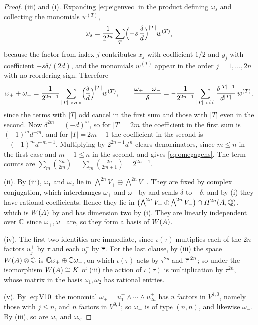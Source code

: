 \begin{proof}
(iii) and (i). Expanding \eqref{eq:eigenvec} in the product defining
$\omega_{s}$ and collecting the monomials $w^{(T)}$,
\begin{equation}\label{eq:omegaexp}
  \omega_{s}
  =\frac{1}{2^{2n}}\sum_{T}\Bigl(-s\,\frac{\delta}{d}\Bigr)^{|T|}w^{(T)},
\end{equation}
because the factor from index $j$ contributes $x_{j}$ with coefficient $1/2$
and $y_{j}$ with coefficient $-s\delta/(2d)$, and the monomials $w^{(T)}$
appear in the order $j=1,\dots,2n$ with no reordering sign. Therefore
\[
  \omega_{+}+\omega_{-}
  =\frac{1}{2^{2n-1}}\sum_{|T|\ \mathrm{even}}\Bigl(\frac{\delta}{d}\Bigr)^{|T|}w^{(T)},
  \qquad
  \frac{\omega_{+}-\omega_{-}}{\delta}
  =-\frac{1}{2^{2n-1}}\sum_{|T|\ \mathrm{odd}}\frac{\delta^{|T|-1}}{d^{|T|}}\,w^{(T)} ,
\]
since the terms with $|T|$ odd cancel in the first sum and those with $|T|$
even in the second. Now
$\delta^{2m}=(-d)^{m}$, so for $|T|=2m$ the coefficient in the first sum is
$(-1)^{m}d^{-m}$, and for $|T|=2m+1$ the coefficient in the second is
$-(-1)^{m}d^{-m-1}$. Multiplying by $2^{2n-1}d^{\,n}$ clears denominators,
since $m\le n$ in the first case and $m+1\le n$ in the second, and gives
\eqref{eq:omegagens}. The term counts are
$\sum_{m}\binom{2n}{2m}=\sum_{m}\binom{2n}{2m+1}=2^{2n-1}$.

(ii). By (iii), $\omega_{1}$ and $\omega_{2}$ lie in
$\bigwedge^{2n}V_{+}\oplus\bigwedge^{2n}V_{-}$. They are fixed by complex
conjugation, which interchanges $\omega_{+}$ and $\omega_{-}$ by
 and sends $\delta$ to $-\delta$, and by (i) they have
rational coefficients. Hence they lie in
$\bigl(\bigwedge^{2n}V_{+}\oplus\bigwedge^{2n}V_{-}\bigr)\cap H^{2n}(A,\mathbb{Q})$,
which is $W(A)$ by  and has dimension two by
(i). They are linearly independent over $\mathbb{C}$ since
$\omega_{+},\omega_{-}$ are, so they form a basis of $W(A)$.

(iv). The first two identities are immediate, since $\iota(\tau)$ multiplies
each of the $2n$ factors $u_{j}^{+}$ by $\tau$ and each $u_{j}^{-}$ by
$\overline{\tau}$. For the last clause, by (iii) the space $W(A)\otimes\mathbb{C}$ is
$\mathbb{C}\omega_{+}\oplus\mathbb{C}\omega_{-}$, on which $\iota(\tau)$ acts by
$\tau^{2n}$ and $\overline{\tau}^{\,2n}$; so under the isomorphism
$W(A)\cong K$ of (iii) the action of $\iota(\tau)$ is
multiplication by $\tau^{2n}$, whose matrix in the basis
$\omega_{1},\omega_{2}$ has rational entries.

(v). By \eqref{eq:V10} the monomial $\omega_{+}=u_{1}^{+}\wedge\cdots\wedge
u_{2n}^{+}$ has $n$ factors in $V^{1,0}$, namely those with $j\le n$, and $n$
factors in $V^{0,1}$; so $\omega_{+}$ is of type $(n,n)$, and likewise
$\omega_{-}$. By (iii), so are $\omega_{1}$ and $\omega_{2}$.
\end{proof}

